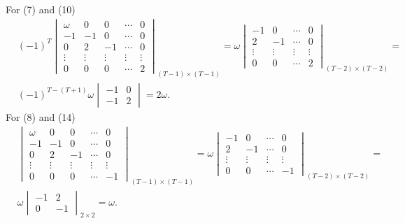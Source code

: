 \documentclass[12pt,a4paper,hyperref]{article}
\begin{document}
For (7) and (10)
\begin{align*}
& (-1)^{T}
\begin{vmatrix}
\omega  & 0     & 0      & \cdots & 0 \\
-1       & -1     & 0     & \cdots & 0 \\
0       & 2      & -1     & \cdots & 0 \\
\vdots  & \vdots & \vdots & \vdots & \vdots \\
0       &  0     & 0      & \cdots & 2
\end{vmatrix}
_{(T-1) \times (T-1)}
=
\omega
\begin{vmatrix}
 -1 & 0 & \cdots & 0 \\
 2 & -1 & \cdots & 0 \\
 \vdots & \vdots & \vdots & \vdots \\
 0 & 0 & \cdots & 2
\end{vmatrix}
_{(T-2) \times (T-2)}= \\ &
(-1)^{T-(T+1)} \omega
\begin{vmatrix}
-1& 0 \\
-1 & 2
\end{vmatrix}
=2 \omega.
\end{align*}
For  (8) and (14)
\begin{align*}
& \begin{vmatrix}
\omega  & 0     & 0      & \cdots & 0 \\
-1      & -1     & 0      & \cdots & 0 \\
0       & 2      &  -1    & \cdots & 0 \\
\vdots  & \vdots & \vdots & \vdots & \vdots \\
0       & 0      & 0      & \cdots & -1
\end{vmatrix}
_{(T-1) \times (T-1)} =
\omega
\begin{vmatrix}
 -1 & 0 & \cdots & 0 \\
 2 & -1 & \cdots & 0 \\
 \vdots & \vdots & \vdots & \vdots \\
0 & 0 & \cdots & -1
\end{vmatrix}
_{(T-2) \times (T-2)}
=  \\
& \omega
\begin{vmatrix}
-1 & 2  \\
0 & -1
\end{vmatrix}
_{2 \times 2}
=\omega.
\end{align*}
\end{document}
